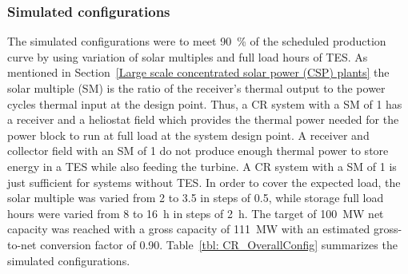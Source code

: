 \subsubsection{Simulated configurations}
The simulated configurations were to meet 90~\% of the scheduled production curve by using variation of solar multiples and full load hours of TES. As mentioned in Section~\ref{Large scale concentrated solar power (CSP) plants} the solar multiple (SM) is the ratio of the receiver's thermal output to the power cycles thermal input at the design point. Thus, a CR system with a SM of 1 has a receiver and a heliostat field which provides the thermal power needed for the power block to run at full load at the system design point. A receiver and collector field with an SM of 1 do not produce enough thermal power to store energy in a TES while also feeding the turbine. A CR system with a SM of 1 is just sufficient for systems without TES. In order to cover the expected load, the solar multiple was varied from 2 to 3.5 in steps of 0.5, while storage full load hours were varied from 8 to 16~h in steps of 2~h. The target of \SI{100}{MW} net capacity was reached with a gross capacity of 111~MW with an estimated gross-to-net conversion factor of 0.90. Table~\ref{tbl: CR_OverallConfig} summarizes the simulated configurations.

